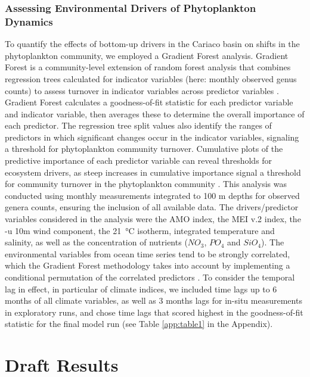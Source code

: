\documentclass[draft]{agujournal2019}
\begin{document}
        
    \subsubsection{Assessing Environmental Drivers of Phytoplankton Dynamics}
    To quantify the effects of bottom-up drivers in the Cariaco basin on shifts in the phytoplankton community, we employed a Gradient Forest analysis. Gradient Forest is a community-level extension of random forest analysis that combines regression trees calculated for indicator variables (here: monthly observed genus counts) to assess turnover in indicator variables across predictor variables \cite{pitcher_example_2012, large_critical_2015, tam_comparing_2017}. Gradient Forest calculates a goodness-of-fit statistic for each predictor variable and indicator variable, then averages these to determine the overall importance of each predictor. The regression tree split values also identify the ranges of predictors in which significant changes occur in the indicator variables, signaling a threshold for phytoplankton community turnover. Cumulative plots of the predictive importance of each predictor variable can reveal thresholds for ecosystem drivers, as steep increases in cumulative importance signal a threshold for community turnover in the phytoplankton community \cite{tam_comparing_2017}. This analysis was conducted using monthly measurements integrated to 100 m depths for observed genera counts, ensuring the inclusion of all available data. The drivers/predictor variables considered in the analysis were the AMO index, the MEI v.2 index, the -u 10m wind component, the \qty{21}{\celsius} isotherm, integrated temperature and salinity, as well as the concentration of nutrients ($NO_3$, $PO_4$ and $SiO_4$). The environmental variables from ocean time series tend to be strongly correlated, which the Gradient Forest methodology takes into account by implementing a conditional permutation of the correlated predictors \cite{ellis_gradient_2012}. To consider the temporal lag in effect, in particular of climate indices, we included time lags up to 6 months of all climate variables, as well as 3 months lags for in-situ measurements in exploratory runs, and chose time lags that scored highest in the goodness-of-fit statistic for the final model run (see Table \ref{app:table1} in the Appendix).
    


\section{Draft Results}
\end{document}
